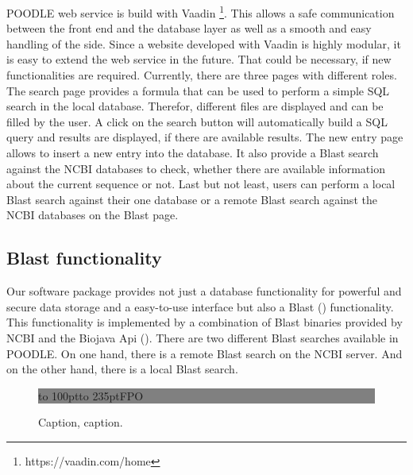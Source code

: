 \documentclass{bioinfo}
\begin{document}
\begin{methods}
POODLE web service is build with Vaadin \footnote{https://vaadin.com/home}. This allows a safe 
communication between the front end and the database layer as well as a smooth and easy handling of 
the side. Since a website developed with Vaadin is highly modular, it is easy to extend the web 
service in the future. That could be necessary, if new functionalities are required. Currently, 
there are three pages with different roles. The search page provides a formula that can be used 
to perform a simple SQL search in the local database. Therefor, different files are displayed and 
can be filled by the user. A click on the search button will automatically build a SQL query and 
results are displayed, if there are available results. The new entry page allows to insert a new 
entry into the database. It also provide a Blast search against the NCBI databases to check, whether 
there are available information about the current sequence or not. Last but not least, users can 
perform a local Blast search against their one database or a remote Blast search against the NCBI 
databases on the Blast page. 

\subsection{Blast functionality}

Our software package provides not just a database functionality for powerful and secure data storage 
and a easy-to-use interface but also a Blast (\citealp{Altschul01}) functionality. This functionality 
is implemented by a combination of Blast binaries provided by NCBI and the Biojava Api 
(\citealp{Prlic01}). There are two different Blast searches available in POODLE. On one hand, there 
is a remote Blast search on the NCBI server. And on the other hand, there is a local Blast search. 


\end{methods}

\begin{figure}[!tpb]%
\fboxsep=0pt\colorbox{gray}{\begin{minipage}[t]{235pt} \vbox to 100pt{\vfill\hbox to
235pt{\hfill\fontsize{24pt}{24pt}\selectfont FPO\hfill}\vfill}
\end{minipage}}
\caption{Caption, caption.}\label{fig:01}
\end{figure}

\end{document}
